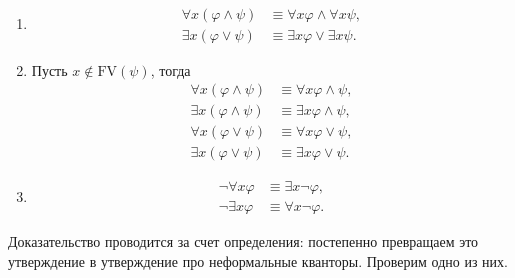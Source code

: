 \documentclass[a4paper, fleqn]{article}
\begin{document}
    \begin{theorem}~
        \begin{enumerate}
            \item \begin{align}
                \forall x (\varphi \land \psi) &\equiv \forall x \varphi \land \forall x \psi, \\
                \exists x (\varphi \lor \psi) &\equiv \exists x \varphi \lor \exists x \psi.
            \end{align}
            \item Пусть $x \notin \text{FV}(\psi)$, тогда \begin{align}
                \forall x (\varphi \land \psi) &\equiv \forall x \varphi \land \psi, \\
                \exists x (\varphi \land \psi) &\equiv \exists x \varphi \land \psi, \\
                \forall x (\varphi \lor \psi) &\equiv \forall x \varphi \lor \psi, \\
                \exists x (\varphi \lor \psi) &\equiv \exists x \varphi \lor \psi.
            \end{align}
            \item \begin{align}
                \neg \forall x \varphi &\equiv \exists x \neg \varphi, \\
                \neg \exists x \varphi &\equiv \forall x \neg \varphi.
            \end{align}
        \end{enumerate}
    \end{theorem}

    Доказательство проводится за счет определения: постепенно превращаем 
    это утверждение в утверждение про неформальные кванторы.
    Проверим одно из них.
\end{document}
